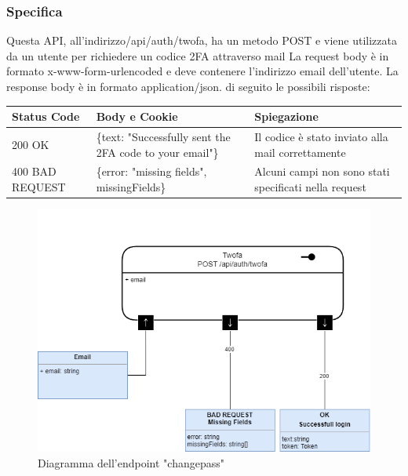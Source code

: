 \documentclass{report}
\begin{document}
\subsubsection*{Specifica}
Questa API, all'indirizzo/api/auth/twofa, ha un metodo POST e viene utilizzata da un utente per richiedere un codice 2FA attraverso mail
La request body è in formato x-www-form-urlencoded e deve contenere l'indirizzo email dell'utente.
La response body è in formato application/json. di seguito le possibili risposte:
\begin{center} %
	\centering
	\begin{tabular}{ |p{4cm}|p{5cm}|p{4cm}| }
		\hline
		\centering Status Code & \qquad\quad Body e Cookie                                & \qquad\qquad Spiegazione                              \\ %
		\hline
		200 OK                 & \{text: "Successfully sent the 2FA code to your email"\} & Il codice è stato inviato alla mail correttamente     \\
		\hline
		400 BAD REQUEST        & \{error: "missing fields", missingFields\}               & Alcuni campi non sono stati specificati nella request \\ %
		\hline
	\end{tabular}
\end{center}
\begin{figure}[H]
	\centering\includegraphics[width=1\textwidth]{images/microservizio-autenticazione/diagrams/diagramma_twofa.drawio.png}
	\caption{Diagramma dell'endpoint "changepass"}
\end{figure}
\end{document}
